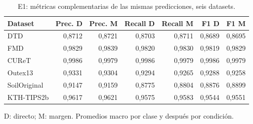 \begin{table}[!htbp]\centering
\fontsize{8}{10}\selectfont\setlength{\tabcolsep}{4pt}
\caption{E1: métricas complementarias de las mismas predicciones, seis datasets.}\label{tab:e1-secondary}
\begin{tabular}{@{}lrrrrrr@{}}\toprule
Dataset & Prec. D & Prec. M & Recall D & Recall M & F1 D & F1 M\\\midrule
DTD & 0,8712 & 0,8721 & 0,8703 & 0,8711 & 0,8689 & 0,8695\\
FMD & 0,9829 & 0,9839 & 0,9820 & 0,9830 & 0,9819 & 0,9829\\
CUReT & 0,9986 & 0,9979 & 0,9986 & 0,9979 & 0,9986 & 0,9979\\
Outex13 & 0,9331 & 0,9304 & 0,9294 & 0,9265 & 0,9288 & 0,9258\\
SoilOriginal & 0,9147 & 0,9159 & 0,8775 & 0,8804 & 0,8876 & 0,8899\\
KTH-TIPS2b & 0,9617 & 0,9621 & 0,9575 & 0,9583 & 0,9544 & 0,9551\\
\bottomrule\end{tabular}
\par\smallskip\begin{minipage}{0.98\textwidth}\footnotesize D: directo; M: margen. Promedios macro por clase y después por condición.\end{minipage}
\end{table}
